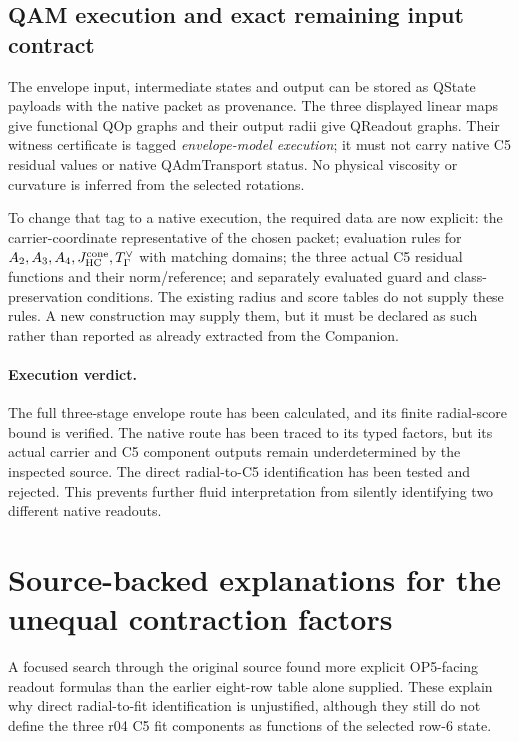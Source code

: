 \documentclass[11pt,a4paper]{article}
\begin{document}
\subsection{QAM execution and exact remaining input contract}
The envelope input, intermediate states and output can be stored as QState
payloads with the native packet as provenance. The three displayed linear
maps give functional QOp graphs and their output radii give QReadout graphs.
Their witness certificate is tagged \emph{envelope-model execution}; it
must not carry native C5 residual values or native QAdmTransport status.
No physical viscosity or curvature is inferred from the selected rotations.

To change that tag to a native execution, the required data are now explicit:
the carrier-coordinate representative of the chosen packet; evaluation
rules for $A_2,A_3,A_4,J_{\rm HC}^{\rm cone},T_\Gamma^\vee$ with matching
domains; the three actual C5 residual functions and their norm/reference;
and separately evaluated guard and class-preservation conditions.
The existing radius and score tables do not supply these rules. A new
construction may supply them, but it must be declared as such rather than
reported as already extracted from the Companion.

\paragraph{Execution verdict.}
The full three-stage envelope route has been calculated, and its finite
radial-score bound is verified. The native route has been traced to its
typed factors, but its actual carrier and C5 component outputs remain
underdetermined by the inspected source. The direct radial-to-C5
identification has been tested and rejected. This prevents further fluid
interpretation from silently identifying two different native readouts.

\section{Source-backed explanations for the unequal contraction factors}
\label{sec:source-backed-bridge-explanations}
A focused search through the original source found more explicit OP5-facing
readout formulas than the earlier eight-row table alone supplied. These
explain why direct radial-to-fit identification is unjustified, although
they still do not define the three r04 C5 fit components as functions of
the selected row-6 state.
\end{document}
